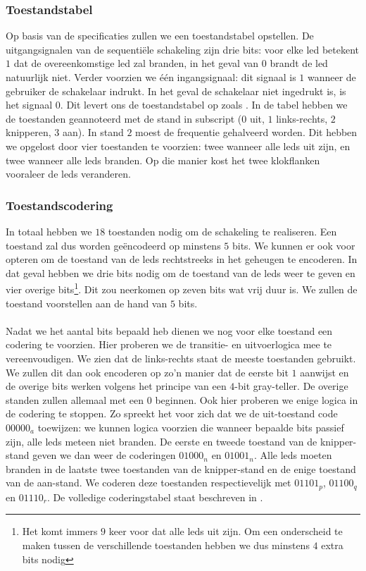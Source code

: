 \subsubsection{Toestandstabel}
Op basis van de specificaties zullen we een toestandstabel opstellen. De uitgangsignalen van de sequenti\"ele schakeling zijn drie bits: voor elke led betekent $1$ dat de overeenkomstige led zal branden, in het geval van $0$ brandt de led natuurlijk niet. Verder voorzien we \'e\'en ingangsignaal: dit signaal is $1$ wanneer de gebruiker de schakelaar indrukt. In het geval de schakelaar niet ingedrukt is, is het signaal $0$. Dit levert ons de toestandstabel op zoals .
In de tabel hebben we de toestanden geannoteerd met de stand in subscript ($0$ uit, $1$ links-rechts, $2$ knipperen, $3$ aan). In stand $2$ moest de frequentie gehalveerd worden. Dit hebben we opgelost door vier toestanden te voorzien: twee wanneer alle leds uit zijn, en twee wanneer alle leds branden. Op die manier kost het twee klokflanken vooraleer de leds veranderen.
\subsubsection{Toestandscodering}
In totaal hebben we $18$ toestanden nodig om de schakeling te realiseren. Een toestand zal dus worden ge\"encodeerd op minstens $5$ bits. We kunnen er ook voor opteren om de toestand van de leds rechtstreeks in het geheugen te encoderen. In dat geval hebben we drie bits nodig om de toestand van de leds weer te geven en vier overige bits\footnote{Het komt immers $9$ keer voor dat alle leds uit zijn. Om een onderscheid te maken tussen de verschillende toestanden hebben we dus minstens $4$ extra bits nodig}. Dit zou neerkomen op zeven bits wat vrij duur is. We zullen de toestand voorstellen aan de hand van $5$ bits.
\paragraph{}
Nadat we het aantal bits bepaald heb dienen we nog voor elke toestand een codering te voorzien. Hier proberen we de transitie- en uitvoerlogica mee te vereenvoudigen. We zien dat de links-rechts staat de meeste toestanden gebruikt. We zullen dit dan ook encoderen op zo'n manier dat de eerste bit $1$ aanwijst en de overige bits werken volgens het principe van een $4$-bit gray-teller. De overige standen zullen allemaal met een $0$ beginnen. Ook hier proberen we enige logica in de codering te stoppen. Zo spreekt het voor zich dat we de uit-toestand code $00000_a$ toewijzen: we kunnen logica voorzien die wanneer bepaalde bits passief zijn, alle leds meteen niet branden. De eerste en tweede toestand van de knipper-stand geven we dan weer de coderingen $01000_n$ en $01001_n$. Alle leds moeten branden in de laatste twee toestanden van de knipper-stand en de enige toestand van de aan-stand. We coderen deze toestanden respectievelijk met $01101_p$, $01100_q$ en $01110_r$. De volledige coderingstabel staat beschreven in .
